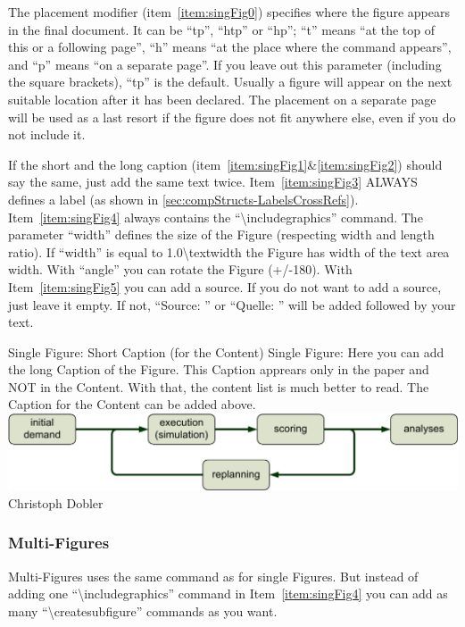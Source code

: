 The placement modifier (item~\ref{item:singFig0})
specifies where the figure appears in the final document.
It can be ``tp'', ``htp'' or ``hp'';
``t'' means ``at the top of this or a following page'',
``h'' means ``at the place where the command appears'',
and ``p'' means ``on a separate page''.
If you leave out this parameter (including the square brackets),
``tp'' is the default.
Usually a figure will appear on the next suitable location
after it has been declared.
The placement on a separate page will be used as a last resort
if the figure does not fit anywhere else, even if you do not include it.

If the short and the long caption
(item~\ref{item:singFig1}\&\ref{item:singFig2}) should say the same,
just add the same text twice. Item~\ref{item:singFig3} ALWAYS defines
a label (as shown in \cref{sec:compStructs-LabelsCrossRefs}).
Item~\ref{item:singFig4} always contains the ``\textbackslash{}includegraphics''
command. The parameter ``width'' defines the size of the Figure
(respecting width and length ratio). If ``width'' is equal to
1.0\textbackslash{}textwidth the Figure has width of the text area width.
With ``angle'' you can rotate the Figure (+/-180).
With Item~\ref{item:singFig5} you can add a source. If you do not want
to add a source, just leave it empty. If not, ``Source: '' or
``Quelle: '' will be added followed by your text.

\createfigure%
{Single Figure: Short Caption (for the Content)}%
{Single Figure: Here you can add the long Caption of the Figure. This
Caption apprears only in the paper and NOT in the Content. With that,
the content list is much better to read. The Caption for the Content
can be added above.}%
{\label{fig:labelOfTheSingleFigure}}%
{\includegraphics[width=1.0\textwidth, angle=90]{figures/MATSimLoop}}%
{Christoph Dobler}

\subsubsection{Multi-Figures}

Multi-Figures uses the same command as for single Figures. But instead
of adding one  ``\textbackslash{}includegraphics'' command in Item~\ref{item:singFig4}
you can add as many ``\textbackslash{}createsubfigure'' commands as you want.

